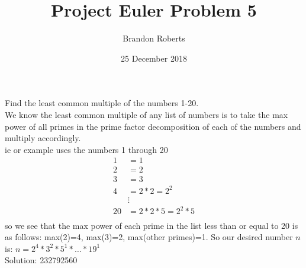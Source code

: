 \documentclass{article}
\begin{document}
\title{Project Euler Problem 5}
\author{Brandon Roberts}
\date{25 December 2018}

\maketitle

Find the least common multiple of the numbers 1-20.\\

We know the least common multiple of any list of numbers is to take the max power of all primes in the prime factor decomposition of each of the numbers and multiply accordingly.\\
ie or example uses the numbers 1 through 20\\
\begin{align*}
1&=1\\
2&=2\\
3&=3\\
4&=2*2=2^{2}\\
&\vdots\\
20&=2*2*5=2^{2}*5\\
\end{align*}
so we see that the max power of each prime in the list less than or equal to 20 is as follows:
max(2)=4, max(3)=2, max(other primes)=1.
So our desired number $n$ is: $n=2^{4}*3^{2}*5^{1}*\dots*19^{1}$\\
Solution: 232792560
\end{document}
